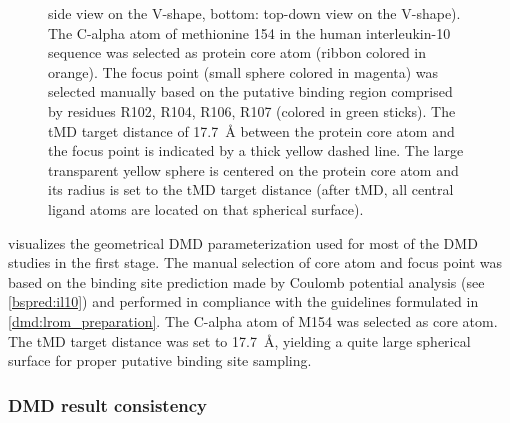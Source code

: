 \begin{figure}
{side view on the V-shape, bottom: top-down view on the V-shape). The C-alpha
atom of methionine 154 in the human interleukin-10 sequence was selected as
protein core atom (ribbon colored in orange). The focus point (small sphere
colored in magenta) was selected manually based on the putative binding region
comprised by residues R102, R104, R106, R107 (colored in green sticks). The tMD
target distance of \SI{17.7}{\angstrom} between the protein core atom and the
focus point is indicated by a thick yellow dashed line. The large transparent
yellow sphere is centered on the protein core atom and its radius is set to the
tMD target distance (after tMD, all central ligand atoms are located on that
spherical surface).}
\label{fig:dmdil10:dmd_geometry_round1}
\end{figure}

 visualizes the geometrical DMD
parameterization used for most of the DMD studies in the first stage. The manual
selection of core atom and focus point was based on the binding site prediction
made by Coulomb potential analysis (see \cref{bspred:il10}) and performed in
compliance with the guidelines formulated in \cref{dmd:lrom_preparation}. The
C-alpha atom of M154 was selected as core atom. The tMD target distance was set
to \SI{17.7}{\angstrom}, yielding a quite large spherical surface for proper
putative binding site sampling.


\subsubsection{DMD result consistency}

